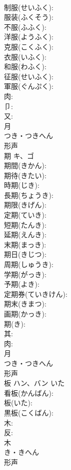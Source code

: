 \documentclass[8pt]{extreport}
\begin{document}
\begin{CJK}{UTF8}{min}
\\	制服(せいふく): 
\\	服装(ふくそう): 
\\	不服(ふふく): 
\\	洋服(ようふく): 
\\	克服(こくふく): 
\\	衣服(いふく): 
\\	和服(わふく): 
\\	征服(せいふく): 
\\	軍服(ぐんぷく): 
\\	肉: 
\\	卩: 
\\	又: 
\\	月	
\\	つき・つきへん	
\\	形声 
\\	期	キ、ゴ			
\\	期間(きかん): 
\\	期待(きたい): 
\\	時期(じき): 
\\	長期(ちょうき): 
\\	期限(きげん): 
\\	定期(ていき): 
\\	短期(たんき): 
\\	延期(えんき): 
\\	末期(まっき): 
\\	期日(きじつ): 
\\	周期(しゅうき): 
\\	学期(がっき): 
\\	予期(よき): 
\\	定期券(ていきけん): 
\\	期末(きまつ): 
\\	画期(かっき): 
\\	期(き): 
\\	其: 
\\	肉: 
\\	月	
\\	つき・つきへん	
\\	形声 
\\	板	ハン、バン	いた		
\\	看板(かんばん): 
\\	板(いた): 
\\	黒板(こくばん): 
\\	木: 
\\	反: 
\\	木	
\\	き・きへん	
\\	形声 

\end{CJK}
\end{document}
